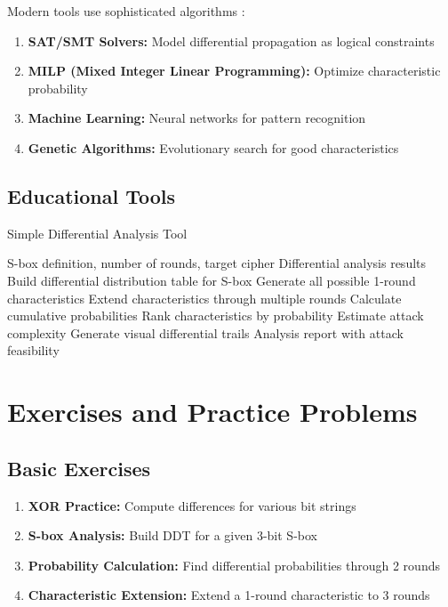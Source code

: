 \documentclass[12pt,a4paper]{article}
\theoremstyle{definition}
\begin{document}
Modern tools use sophisticated algorithms \cite{mouha2011automatic,sun2014automatic}:

\begin{enumerate}
    \item \textbf{SAT/SMT Solvers:} Model differential propagation as logical constraints
    \item \textbf{MILP (Mixed Integer Linear Programming):} Optimize characteristic probability
    \item \textbf{Machine Learning:} Neural networks for pattern recognition
    \item \textbf{Genetic Algorithms:} Evolutionary search for good characteristics
\end{enumerate}

\subsection{Educational Tools}

\begin{algorithmbox}{Simple Differential Analysis Tool}
\begin{algorithmic}[1]
\REQUIRE S-box definition, number of rounds, target cipher
\ENSURE Differential analysis results
\STATE Build differential distribution table for S-box
\STATE Generate all possible 1-round characteristics
\STATE Extend characteristics through multiple rounds
\STATE Calculate cumulative probabilities  
\STATE Rank characteristics by probability
\STATE Estimate attack complexity
\STATE Generate visual differential trails
\RETURN Analysis report with attack feasibility
\end{algorithmic}
\end{algorithmbox}

\section{Exercises and Practice Problems}

\subsection{Basic Exercises}

\begin{enumerate}
    \item \textbf{XOR Practice:} Compute differences for various bit strings
    \item \textbf{S-box Analysis:} Build DDT for a given 3-bit S-box
    \item \textbf{Probability Calculation:} Find differential probabilities through 2 rounds
    \item \textbf{Characteristic Extension:} Extend a 1-round characteristic to 3 rounds
\end{enumerate}
\end{document}
